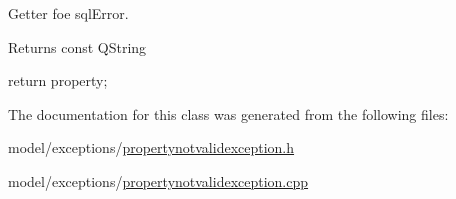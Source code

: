 \-Getter foe sql\-Error. 

\begin{DoxyReturn}{\-Returns}
const \-Q\-String 
\end{DoxyReturn}

\begin{DoxyCode}
{
    return property;
}
\end{DoxyCode}


\-The documentation for this class was generated from the following files\-:\begin{DoxyCompactItemize}
\item 
model/exceptions/\hyperlink{propertynotvalidexception_8h}{propertynotvalidexception.\-h}\item 
model/exceptions/\hyperlink{propertynotvalidexception_8cpp}{propertynotvalidexception.\-cpp}\end{DoxyCompactItemize}
